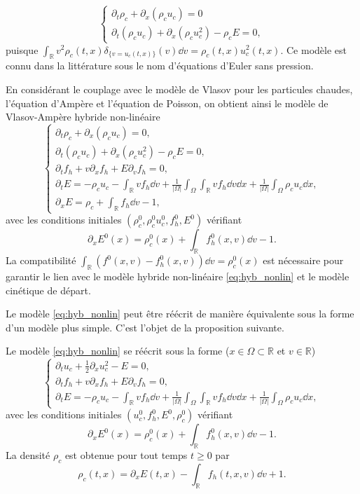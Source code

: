 $$
  \begin{cases}
    \partial_t \rho_c + \partial_x (\rho_cu_c) = 0 \\
    \partial_t (\rho_cu_c) + \partial_x (\rho_cu_c^2) - \rho_cE = 0,
  \end{cases}
$$
puisque $\int_{\mathbb{R}} v^2 \rho_c(t,x)\delta_{\{v=u_c(t,x)\}}(v)  \dd{v} = \rho_c(t,x) u_c^2 (t,x)$. Ce modèle est connu dans la littérature sous le nom d'équations d'Euler sans pression.

En considérant le couplage avec le modèle de Vlasov pour les particules chaudes, l'équation d'Ampère et l'équation de Poisson, on obtient ainsi le modèle de Vlasov-Ampère hybride non-linéaire
\begin{equation}
  \begin{cases}
    \partial_t \rho_c + \partial_x (\rho_cu_c) = 0, \\
    \partial_t (\rho_cu_c) + \partial_x (\rho_cu_c^2) - \rho_cE = 0, \\
    \partial_t f_h + v\partial_x f_h + E\partial_v f_h = 0, \\
    \partial_t E = -\rho_cu_c -\int_{\mathbb{R}} vf_h \dd{v}+ \frac{1}{|\Omega|}\int_\Omega \int_{\mathbb{R}} vf_h \dd{v}\dd{x} + \frac{1}{|\Omega|}\int_\Omega \rho_cu_c \dd{x}, \\
    \partial_x E = \rho_c + \int_{\mathbb{R}} f_h \dd{v} - 1, 
  \end{cases}
\label{eq:hyb_nonlin}
\end{equation}
avec les conditions initiales $(\rho^0_{c}, \rho^0_{c} u^0_{c}, f^0_{h}, E^0)$ vérifiant
$$
  \partial_x E^0(x) = \rho^0_{c}(x)+\int_{\mathbb{R}} f^0_{h}(x, v) \dd{v}-1.
$$ 
La compatibilité $\int_{\mathbb{R}} (f^0(x, v) - f^0_h(x, v)) \dd{v}  = \rho^0_{c}(x)$ est nécessaire pour garantir le lien avec le modèle hybride non-linéaire \eqref{eq:hyb_nonlin} et le modèle cinétique de départ. 

Le modèle \eqref{eq:hyb_nonlin} peut être réécrit de manière équivalente sous la forme d'un modèle plus simple. C'est l'objet de la proposition suivante.  
\begin{pro}
  Le modèle \eqref{eq:hyb_nonlin} se réécrit sous la forme ($x\in\Omega\subset \mathbb{R}$ et $v\in\mathbb{R}$)
  $$
    \begin{cases}
      \partial_t u_c + \frac{1}{2}\partial_x u_c^2 - E = 0, \\
      \partial_t f_h + v\partial_x f_h + E\partial_v f_h = 0, \\
      \partial_t E = -\rho_c u_c -\int_{\mathbb{R}} vf_h \dd{v}+ \frac{1}{|\Omega|}\int_\Omega \int_{\mathbb{R}} vf_h \dd{v}  \dd{x}+ \frac{1}{|\Omega|}\int_\Omega \rho_cu_c  \dd{x},
      \label{eq:hyb_nonlin_red}
    \end{cases}
  $$
  avec les conditions initiales $(u^0_{c}, f^0_{h}, E^0, \rho_c^0)$ vérifiant
  $$
    \partial_x E^0(x) = \rho^0_{c}(x)+\int_{\mathbb{R}} f^0_{h}(x, v) \dd{v} - 1.
  $$
  La densité $\rho_c$ est obtenue pour tout temps $t\geq 0$ par  
  $$
    \rho_c(t, x) = \partial_x E(t, x) - \int_{\mathbb{R}} f_{h}(t, x, v) \dd{v} + 1. 
  $$
\end{pro}

